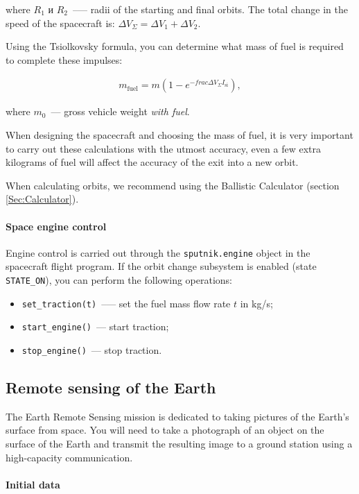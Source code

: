 \documentclass[12pt,a4paper]{article}
\begin{document}
where $R_1$ и $R_2$~--— radii of the starting and final orbits. The total change in the speed of the spacecraft is: $\Delta V_\Sigma = \Delta V_1 + \Delta V_2$.

Using the Tsiolkovsky formula, you can determine what mass of fuel is required to complete these impulses:

\begin{eqnarray}
  m_{\text{fuel}} = m \left( 1 - e^{-frac{\Delta V_\Sigma}{I_{\text{si}}}}\right),
\end{eqnarray}

where $m_0$~--- gross vehicle weight \emph{with fuel}.

When designing the spacecraft and choosing the mass of fuel, it is very important to carry out these calculations with the utmost accuracy, even a few extra kilograms of fuel will affect the accuracy of the exit into a new orbit.

When calculating orbits, we recommend using the Ballistic Calculator (section
\ref{Sec:Calculator}).

\paragraph{Space engine control}

Engine control is carried out through the \verb'sputnik.engine' object in the spacecraft flight program. If the orbit change subsystem is enabled (state \verb'STATE_ON'), you can perform the following operations:

\begin{itemize}
\item \verb'set_traction(t)'~--— set the fuel mass flow rate $t$ in kg/s;
\item \verb'start_engine()'~--- start traction;
\item \verb'stop_engine()'~--- stop traction.
\end{itemize}

\clearpage
\subsection{Remote sensing of the Earth}

The Earth Remote Sensing mission is dedicated to taking pictures of the Earth's surface from space.
You will need to take a photograph of an object on the surface of the Earth and transmit the resulting image to a ground station using a high-capacity communication.

\paragraph{Initial data}
\end{document}
